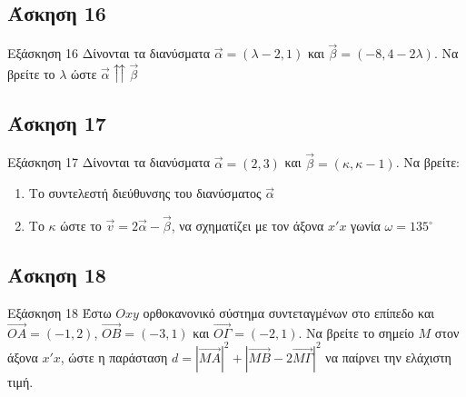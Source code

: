 \documentclass[greek]{beamer}
\begin{document}
\subsection{Άσκηση 16}
\begin{frame}[label=Άσκηση16,t]{Εξάσκηση 16}
      Δίνονται τα διανύσματα $\vec{α}=(λ-2,1)$ και $\vec{β}=(-8,4-2λ)$. Να βρείτε το $λ$ ώστε $\vec{α}\upuparrows \vec{β}$
\end{frame}

\subsection{Άσκηση 17}
\begin{frame}[label=Άσκηση17,t]{Εξάσκηση 17}
      Δίνονται τα διανύσματα $\vec{α}=(2,3)$ και $\vec{β}=(κ,κ-1)$. Να βρείτε:
      \begin{enumerate}
            \item<1-> Το συντελεστή διεύθυνσης του διανύσματος $\vec{α}$
            \item<2-> Το $κ$ ώστε το $\vec{v}=2\vec{α}-\vec{β}$, να σχηματίζει με τον άξονα $x'x$ γωνία $ω=135^{\circ}$
      \end{enumerate}
\end{frame}

\subsection{Άσκηση 18}
\begin{frame}[label=Άσκηση18,t]{Εξάσκηση 18}
      Έστω $Οxy$ ορθοκανονικό σύστημα συντεταγμένων στο επίπεδο και $\overrightarrow{ΟΑ}=(-1,2)$, $\overrightarrow{ΟΒ}=(-3,1)$ και $\overrightarrow{ΟΓ}=(-2,1)$. Να βρείτε το σημείο $Μ$ στον άξονα $x'x$, ώστε η παράσταση $d=|\overrightarrow{ΜΑ}|^2+|\overrightarrow{ΜΒ}-2\overrightarrow{ΜΓ}|^2$ να παίρνει την ελάχιστη τιμή.
\end{frame}
\end{document}

